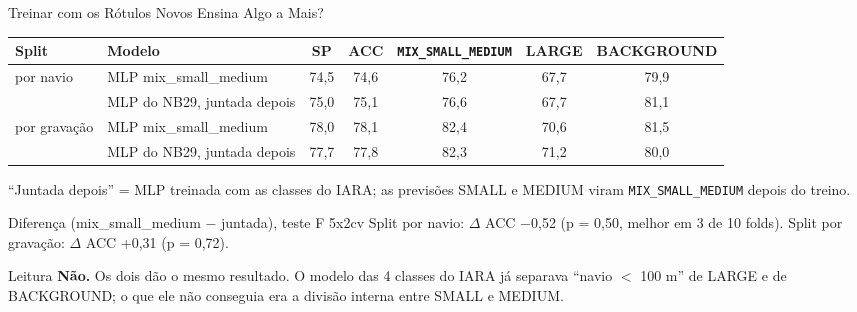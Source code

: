 \documentclass[aspectratio=169]{beamer}
\newcommand{\mix}{\texttt{MIX\_SMALL\_MEDIUM}}
\begin{document}
\begin{frame}{Treinar com os Rótulos Novos Ensina Algo a Mais?}
    \footnotesize
    \begin{table}
    \centering
    \scriptsize
    \setlength{\tabcolsep}{4pt}
    \begin{tabular}{llccccc}
    \toprule
    Split & Modelo & SP & ACC & \mix & LARGE & BACKGROUND \\
    \midrule
    \multirow{2}{*}{por navio} & MLP mix\_small\_medium & 74,5 & 74,6 & 76,2 & 67,7 & 79,9 \\
     & MLP do NB29, juntada depois & 75,0 & 75,1 & 76,6 & 67,7 & 81,1 \\
    \midrule
    \multirow{2}{*}{por gravação} & MLP mix\_small\_medium & 78,0 & 78,1 & 82,4 & 70,6 & 81,5 \\
     & MLP do NB29, juntada depois & 77,7 & 77,8 & 82,3 & 71,2 & 80,0 \\
    \bottomrule
    \end{tabular}
    \end{table}
    {\tiny ``Juntada depois'' = MLP treinada com as classes do IARA; as previsões SMALL e MEDIUM viram \mix{} depois do treino.\par}
    \vspace{0.1cm}
    \begin{block}{\small Diferença (mix\_small\_medium $-$ juntada), teste F 5x2cv}
        \scriptsize
        Split por navio: $\Delta$ ACC $-$0,52 (p = 0,50, melhor em 3 de 10 folds). \quad Split por gravação: $\Delta$ ACC +0,31 (p = 0,72).
    \end{block}
    \begin{alertblock}{Leitura}
        \scriptsize
        \textbf{Não.} Os dois dão o mesmo resultado. O modelo das 4 classes do IARA já separava ``navio $<$ 100 m'' de LARGE e de BACKGROUND; o que ele não conseguia era a divisão interna entre SMALL e MEDIUM.
    \end{alertblock}
\end{frame}
\end{document}
